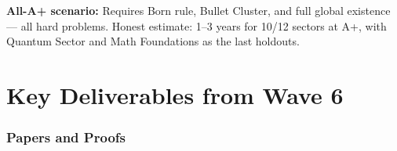 \documentclass[11pt,a4paper]{article}
\begin{document}
\textbf{All-A+ scenario:} Requires Born rule, Bullet Cluster, and full
global existence --- all hard problems. Honest estimate: 1--3 years
for 10/12 sectors at A+, with Quantum Sector and Math Foundations as
the last holdouts.


\newpage
\part{Key Deliverables from Wave 6}
\label{part:deliverables}

\section{Papers and Proofs}
\end{document}
